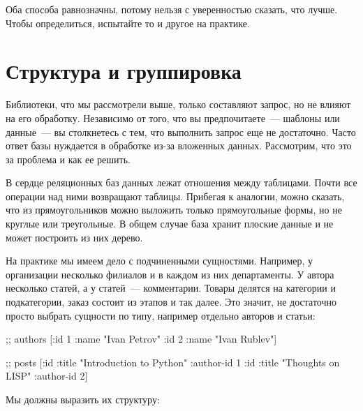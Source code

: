 Оба способа равнозначны, потому нельзя с уверенностью сказать, что лучше. Чтобы определиться, испытайте то и другое на практике.

\section{Структура и группировка}


Библиотеки, что мы рассмотрели выше, только составляют запрос, но не влияют на его обработку. Независимо от того, что вы предпочитаете~--- шаблоны или данные~--- вы столкнетесь с тем, что выполнить запрос еще не достаточно. Часто ответ базы нуждается в обработке из-за вложенных данных. Рассмотрим, что это за проблема и как ее решить.

В сердце реляционных баз данных лежат отношения между таблицами. Почти все операции над ними возвращают таблицы. Прибегая к аналогии, можно сказать, что из прямоугольников можно выложить только прямоугольные формы, но не круглые или треугольные. В общем случае база хранит плоские данные и не может построить из них дерево.

На практике мы имеем дело с подчиненными сущностями. Например, у организации несколько филиалов и в каждом из них департаменты. У автора несколько статей, а у статей~--- комментарии. Товары делятся на категории и подкатегории, заказ состоит из этапов и так далее. Это значит, не достаточно просто выбрать сущности по типу, например отдельно авторов и статьи:

\begin{english}
  \begin{clojure}
;; authors
[{:id 1 :name "Ivan Petrov"}
 {:id 2 :name "Ivan Rublev"}]

;; posts
[{:id :title "Introduction to Python" :author-id 1}
 {:id :title "Thoughts on LISP" :author-id 2}]
  \end{clojure}
\end{english}

Мы должны выразить их структуру:

\begin{english}
  \begin{clojure}
  \end{clojure}
\end{english}

